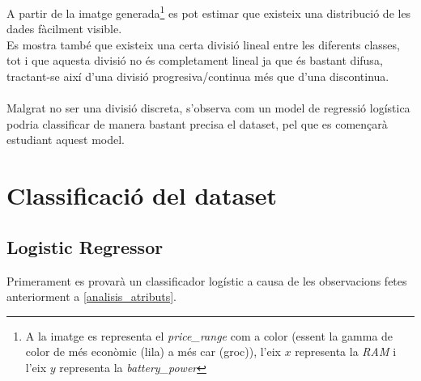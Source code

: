 \documentclass[a4paper, 11pt]{article}
\begin{document}
A partir de la imatge generada\footnote{A la imatge es representa el \textit{price\_range} com a color (essent la gamma de color de més econòmic (lila) a més car (groc)), l'eix $x$ representa la \textit{RAM} i l'eix $y$ representa la \textit{battery\_power}} es pot estimar que existeix una distribució de les dades fàcilment visible.\\
Es mostra també que existeix una certa divisió lineal entre les diferents classes, tot i que aquesta divisió no és completament lineal ja que és bastant difusa, tractant-se així d'una divisió progresiva/continua més que d'una discontinua.\\\\
Malgrat no ser una divisió discreta, s'observa com un model de regressió logística podria classificar de manera bastant precisa el dataset, pel que es començarà estudiant aquest model.

\newpage
\section{Classificació del dataset}\label{classificacio}
\subsection{Logistic Regressor} \label{logistic}
Primerament es provarà un classificador logístic a causa de les observacions fetes anteriorment a \textcolor{blue}{\ref{analisis_atributs}}.
\end{document}
